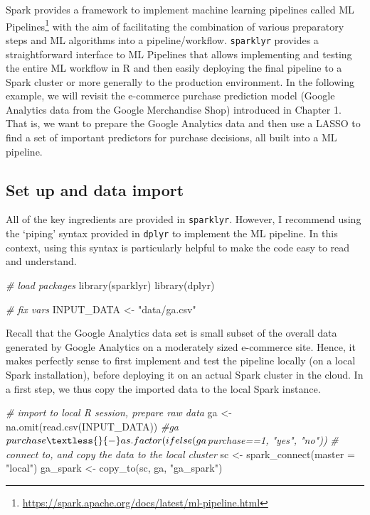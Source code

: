 \documentclass[
  12pt,
]{style/krantz}
\newenvironment{Shaded}{\begin{snugshade}}{\end{snugshade}}
\newcommand{\AttributeTok}[1]{\textcolor[rgb]{0.77,0.63,0.00}{#1}}
\newcommand{\CommentTok}[1]{\textcolor[rgb]{0.56,0.35,0.01}{\textit{#1}}}
\newcommand{\FunctionTok}[1]{\textcolor[rgb]{0.00,0.00,0.00}{#1}}
\newcommand{\NormalTok}[1]{#1}
\newcommand{\OtherTok}[1]{\textcolor[rgb]{0.56,0.35,0.01}{#1}}
\newcommand{\StringTok}[1]{\textcolor[rgb]{0.31,0.60,0.02}{#1}}
\renewcommand{\href}[2]{#2\footnote{\url{#1}}}
\begin{document}
Spark provides a framework to implement machine learning pipelines called \href{https://spark.apache.org/docs/latest/ml-pipeline.html}{ML Pipelines} with the aim of facilitating the combination of various preparatory steps and ML algorithms into a pipeline/workflow. \texttt{sparklyr} provides a straightforward interface to ML Pipelines that allows implementing and testing the entire ML workflow in R and then easily deploying the final pipeline to a Spark cluster or more generally to the production environment. In the following example, we will revisit the e-commerce purchase prediction model (Google Analytics data from the Google Merchandise Shop) introduced in Chapter 1. That is, we want to prepare the Google Analytics data and then use a LASSO to find a set of important predictors for purchase decisions, all built into a ML pipeline.

\hypertarget{set-up-and-data-import}{%
\subsection{Set up and data import}\label{set-up-and-data-import}}

All of the key ingredients are provided in \texttt{sparklyr}. However, I recommend using the `piping' syntax provided in \texttt{dplyr} to implement the ML pipeline. In this context, using this syntax is particularly helpful to make the code easy to read and understand.

\begin{Shaded}
\begin{Highlighting}[]
\CommentTok{\# load packages}
\FunctionTok{library}\NormalTok{(sparklyr)}
\FunctionTok{library}\NormalTok{(dplyr)}

\CommentTok{\# fix vars}
\NormalTok{INPUT\_DATA }\OtherTok{\textless{}{-}} \StringTok{"data/ga.csv"}
\end{Highlighting}
\end{Shaded}

Recall that the Google Analytics data set is small subset of the overall data generated by Google Analytics on a moderately sized e-commerce site. Hence, it makes perfectly sense to first implement and test the pipeline locally (on a local Spark installation), before deploying it on an actual Spark cluster in the cloud. In a first step, we thus copy the imported data to the local Spark instance.

\begin{Shaded}
\begin{Highlighting}[]
\CommentTok{\# import to local R session, prepare raw data}
\NormalTok{ga }\OtherTok{\textless{}{-}} \FunctionTok{na.omit}\NormalTok{(}\FunctionTok{read.csv}\NormalTok{(INPUT\_DATA))}
\CommentTok{\#ga$purchase \textless{}{-} as.factor(ifelse(ga$purchase==1, "yes", "no"))}
\CommentTok{\# connect to, and copy the data to the local cluster}
\NormalTok{sc }\OtherTok{\textless{}{-}} \FunctionTok{spark\_connect}\NormalTok{(}\AttributeTok{master =} \StringTok{"local"}\NormalTok{)}
\NormalTok{ga\_spark }\OtherTok{\textless{}{-}} \FunctionTok{copy\_to}\NormalTok{(sc, ga, }\StringTok{"ga\_spark"}\NormalTok{)}
\end{Highlighting}
\end{Shaded}
\end{document}
